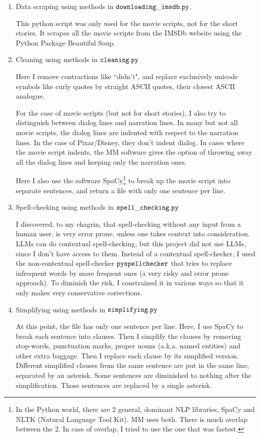 \documentclass[12pt]{article}
\begin{document}
\begin{enumerate}
\item Data scraping using methods in $\tt downloading\_imsdb.py$.

This python script was only used for the movie
scripts, not for the short stories. It 
scrapes all the movie scripts from the IMSDb
website using the Python Package Beautiful Soup.

\item Cleaning using methods in $\tt cleaning.py$

Here I remove contractions like ``didn't",
and replace exclusively unicode symbols like
curly quotes by straight ASCII quotes, their closest ASCII analogue.

For the case of movie scripts (but not for short 
stories), I also try to distinguish between 
dialog lines and narration lines.
In many but not all movie scripts, the dialog lines are indented with 
respect to the narration lines.
In the case of Pixar/Disney, they don't indent dialog. In cases where the movie script indents,
the MM software gives the option of throwing away all the dialog lines and keeping only the narration
ones.

Here I also use the software SpaCy\footnote{In the Python
world, there are 2 general, dominant
NLP libraries, SpaCy and NLTK (Natural Language Tool Kit). MM uses both. There is much overlap
between the 2. In case of overlap, I tried to use the one that was fastest.} to break up the movie script into 
separate sentences, and return a file with only
one sentence per line.

\item Spell-checking using methods in $\tt spell\_checking.py$

I discovered, to my chagrin, that spell-checking
without any input from a human user,
is very error prone, unless one takes context into consideration. LLMs can do contextual spell-checking, but this project did not use LLMs,
since I don't have access to them.
Instead of a contextual spell-checker,
I used the non-contextual
spell-checker $\tt pyspellchecker$
that tries to replace infrequent words by
more frequent ones (a very risky
and error prone approach). To 
diminish the risk, I
 constrained it in various ways so
that it only makes very conservative corrections.

\item Simplifying using methods in $\tt simplifying.py$

At this point, the file
has only one
sentence per line.
Here, I  use SpaCy to
break each sentence into clauses.
Then I simplify the clauses by removing
stop-words, punctuation marks, proper nouns (a.k.a. named entities) and other extra baggage.
Then I replace each clause by its simplified version.
Different simplified clauses from the same sentence
are put in the same line, separated by an asterisk.
Some sentences are diminished to nothing after
the simplification.
Those sentences are replaced by a single asterisk.


\end{enumerate}
\end{document}
